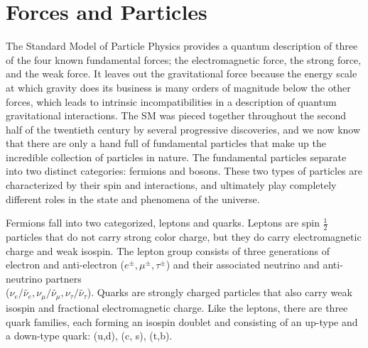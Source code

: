 \iffalse
By the early 1930's, particle physics theory came out of nuclear physics studies of electrons and atomic nuclei.  At this time, of the observed particle phenomena could be explained by a very small set of particles consisting of the electron and positron, proton and neutron, the photon, and the neutrino and anti-neutrino.  Electromagnetism was still understood through Maxwell's Equations and weak force interactions were newly enlightened by Enrico Fermi's development of contact interactions.  Soon, our knowledge of particles and interactions was proven to be insufficient as relativistic calculations were being attempted and new particle discoveries were emerging from cloud and bubble chamber experiments.
\fi

\section{Forces and Particles}
\label{sec:forces}
The Standard Model of Particle Physics provides a quantum description of three of the four known fundamental forces; the electromagnetic force, the strong force, and the weak force.  It leaves out the gravitational force because the energy scale at which gravity does its business is many orders of magnitude below the other forces, which leads to intrinsic incompatibilities in a description of quantum gravitational interactions.   The SM was pieced together throughout the second half of the twentieth century by several progressive discoveries, and we now know that there are only a hand full of fundamental particles that make up the incredible collection of particles in nature.  The fundamental particles separate into two distinct categories: fermions and bosons.  These two types of particles are characterized by their spin and interactions, and ultimately play completely different roles in the state and phenomena of the universe. \cite{tully}


Fermions fall into two categorized, leptons and quarks.  Leptons are spin $\frac{1}{2}$ particles that do not carry strong color charge, but they do carry electromagnetic charge and weak isospin.  The lepton group consists of three generations of electron and anti-electron ($e^\pm, \mu^\pm, \tau^\pm$) and their associated neutrino and anti-neutrino partners\\ ($\nu_e/\tilde{\nu_e}, \nu_\mu/\tilde{\nu_\mu}, \nu_\tau/\tilde{\nu_\tau}$).  Quarks are strongly charged particles that also carry weak isospin and fractional electromagnetic charge.  Like the leptons, there are three quark families, each forming an isospin doublet and consisting of an up-type and a down-type quark: {(u,d), (c, s), (t,b)}.

